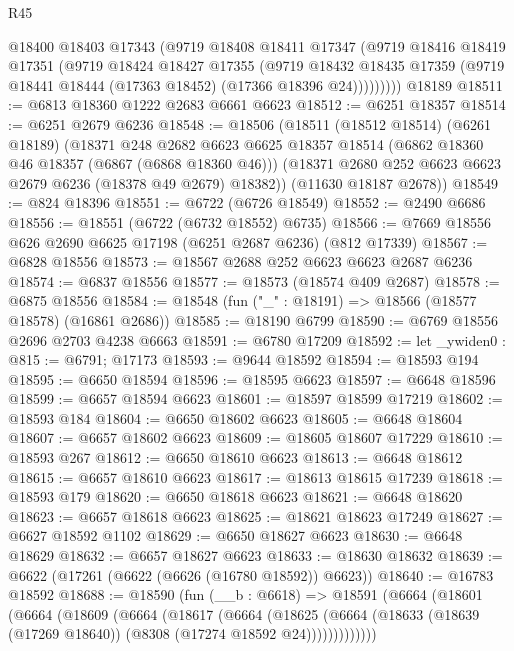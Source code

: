 \begin{lexlean}{R45}
\begin{coremodule}
{          @18400
          @18403
          @17343
          (@9719
            @18408
            @18411
            @17347
            (@9719
              @18416
              @18419
              @17351
              (@9719
                @18424
                @18427
                @17355
                (@9719
                  @18432
                  @18435
                  @17359
                  (@9719 @18441 @18444 (@17363 @18452) (@17366 @18396 @24)))))))))
    @18189
@18511 := @6813 @18360 @1222 @2683 @6661 @6623
@18512 := @6251 @18357
@18514 := @6251 @2679 @6236
@18548 := @18506
    (@18511
      (@18512 @18514)
      (@6261 @18189)
      (@18371
        @248
        @2682
        @6623
        @6625
        @18357
        @18514
        (@6862 @18360 @46 @18357 (@6867 (@6868 @18360 @46)))
        (@18371 @2680 @252 @6623 @6623 @2679 @6236 (@18378 @49 @2679) @18382))
      (@11630 @18187 @2678))
@18549 := @824 @18396
@18551 := @6722 (@6726 @18549)
@18552 := @2490 @6686
@18556 := @18551 (@6722 (@6732 @18552) @6735)
@18566 := @7669 @18556 @626 @2690 @6625 @17198 (@6251 @2687 @6236) (@812 @17339)
@18567 := @6828 @18556
@18573 := @18567 @2688 @252 @6623 @6623 @2687 @6236
@18574 := @6837 @18556
@18577 := @18573 (@18574 @409 @2687)
@18578 := @6875 @18556
@18584 := @18548 (fun ("_" : @18191) => @18566 (@18577 @18578) (@16861 @2686))
@18585 := @18190 @6799
@18590 := @6769 @18556 @2696 @2703 @4238 @6663
@18591 := @6780 @17209
@18592 := let _ywiden0 : @815 := @6791; @17173
@18593 := @9644 @18592
@18594 := @18593 @194
@18595 := @6650 @18594
@18596 := @18595 @6623
@18597 := @6648 @18596
@18599 := @6657 @18594 @6623
@18601 := @18597 @18599 @17219
@18602 := @18593 @184
@18604 := @6650 @18602 @6623
@18605 := @6648 @18604
@18607 := @6657 @18602 @6623
@18609 := @18605 @18607 @17229
@18610 := @18593 @267
@18612 := @6650 @18610 @6623
@18613 := @6648 @18612
@18615 := @6657 @18610 @6623
@18617 := @18613 @18615 @17239
@18618 := @18593 @179
@18620 := @6650 @18618 @6623
@18621 := @6648 @18620
@18623 := @6657 @18618 @6623
@18625 := @18621 @18623 @17249
@18627 := @6627 @18592 @1102
@18629 := @6650 @18627 @6623
@18630 := @6648 @18629
@18632 := @6657 @18627 @6623
@18633 := @18630 @18632
@18639 := @6622 (@17261 (@6622 (@6626 (@16780 @18592)) @6623))
@18640 := @16783 @18592
@18688 := @18590
    (fun (__b : @6618) =>
    @18591
      (@6664
        (@18601
          (@6664
            (@18609
              (@6664
                (@18617
                  (@6664
                    (@18625
                      (@6664 (@18633 (@18639 (@17269 @18640)) (@8308 (@17274 @18592 @24)))))))))))))
}
\end{coremodule}
\end{lexlean}
